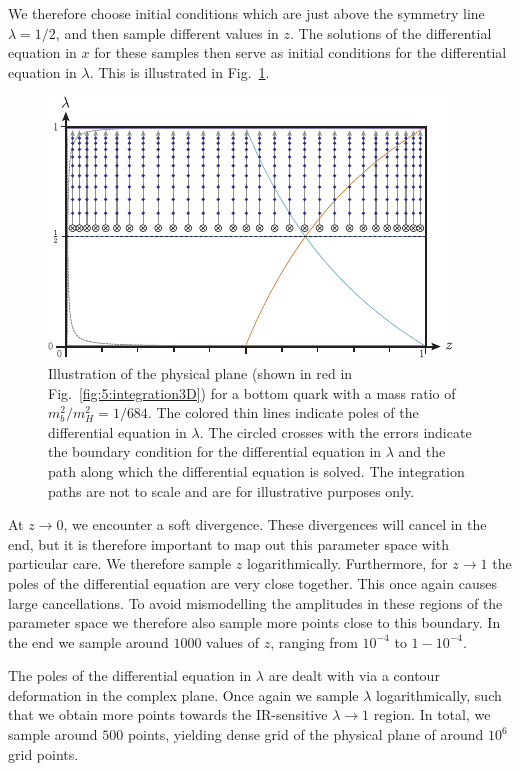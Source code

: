 We therefore choose initial conditions which are just above the symmetry line $\lambda = 1/2$, and then sample different values in $z$. The solutions of the differential equation in $x$ for these samples then serve as initial conditions for the differential equation in $\lambda$. This is illustrated in Fig.~\ref{fig:5:integration2D}.
\begin{figure}
\centering
\includegraphics[width=\figurewidth]{Images/integration_Z_LA_with_poles_mb2_with_contour.pdf}
\caption{Illustration of the physical plane (shown in red in Fig.~\ref{fig:5:integration3D}) for a bottom quark with a mass ratio of $m_b^2/m_H^2 = 1/684$. The colored thin lines indicate poles of the differential equation in $\lambda$. The circled crosses with the errors indicate the boundary condition for the differential equation in $\lambda$ and the path along which the differential equation is solved. The integration paths are not to scale and are for illustrative purposes only.}
\label{fig:5:integration2D}
\end{figure}
At $z \rightarrow 0$, we encounter a soft divergence. These divergences will cancel in the end, but it is therefore important to map out this parameter space with particular care. We therefore sample $z$ logarithmically. Furthermore, for $z \rightarrow 1$ the poles of the differential equation are very close together. This once again causes large cancellations. To avoid mismodelling the amplitudes in these regions of the parameter space we therefore also sample more points close to this boundary. In the end we sample around $1000$ values of $z$, ranging from $10^{-4}$ to $1 - 10^{-4}$.

The poles of the differential equation in $\lambda$ are dealt with via a contour deformation in the complex plane. Once again we sample $\lambda$ logarithmically, such that we obtain more points towards the \acs{IR}-sensitive $\lambda \rightarrow 1$ region. In total, we sample around $500$ points, yielding dense grid of the physical plane of around $10^6$ grid points.

